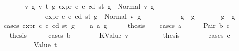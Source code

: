 \begin{isabellebody}
\ \ \ \ \ \ \ {\isachardoublequoteopen}{\isasymAnd}v\ g{\isacharprime}{\kern0pt}\ v{\isacharprime}{\kern0pt}\ t{\isacharprime}{\kern0pt}\ g{\isacharprime}{\kern0pt}{\isacharprime}{\kern0pt}{\isachardot}{\kern0pt}\ expr\ e{}\ e\ cd\ st\ g\ {\isacharequal}{\kern0pt}\ Normal\ {\isacharparenleft}{\kern0pt}v{\isacharcomma}{\kern0pt}\ g{\isacharprime}{\kern0pt}{\isacharparenright}{\kern0pt}\isanewline
\ \ \ \ \ \ \ \ \ \ \ \ {\isasymLongrightarrow}\ expr\ e{}\ e\ cd\ st\ g{\isacharprime}{\kern0pt}\ {\isacharequal}{\kern0pt}\ Normal\ {\isacharparenleft}{\kern0pt}v{\isacharprime}{\kern0pt}{\isacharcomma}{\kern0pt}\ g{\isacharprime}{\kern0pt}{\isacharprime}{\kern0pt}{\isacharparenright}{\kern0pt}\isanewline
\ \ \ \ \ \ \ \ \ \ {\isasymLongrightarrow}\ g{\isacharprime}{\kern0pt}{\isacharprime}{\kern0pt}\ {\isasymle}\ g{\isacharprime}{\kern0pt}{\isachardoublequoteclose}\isanewline
\ \ \ \ \ \ \ {\isachardoublequoteopen}g{\isacharprime}{\kern0pt}\ {\isasymle}\ g{\isachardoublequoteclose}\isanewline
%
\isadelimproof
%
\endisadelimproof
%
\isatagproof
{}\isamarkupfalse%
\ {\isacharparenleft}{\kern0pt}cases\ {\isachardoublequoteopen}expr\ e{}\ e\ cd\ st\ g{\isachardoublequoteclose}{\isacharparenright}{\kern0pt}\isanewline
\ \ \isamarkupfalse%
\ {\isacharparenleft}{\kern0pt}n\ a\ g{}{\isacharprime}{\kern0pt}{\isacharparenright}{\kern0pt}\isanewline
\ \ \isamarkupfalse%
\ \isamarkupfalse%
\ {\isacharquery}{\kern0pt}thesis\isanewline
\ \ \isamarkupfalse%
\ {\isacharparenleft}{\kern0pt}cases\ a{\isacharparenright}{\kern0pt}\isanewline
\ \ \ \ \isamarkupfalse%
\ {\isacharparenleft}{\kern0pt}Pair\ b\ c{\isacharparenright}{\kern0pt}\isanewline
\ \ \ \ \isamarkupfalse%
\ \isamarkupfalse%
\ {\isacharquery}{\kern0pt}thesis\isanewline
\ \ \ \ \isamarkupfalse%
\ {\isacharparenleft}{\kern0pt}cases\ b{\isacharparenright}{\kern0pt}\isanewline
\ \ \ \ \ \ \isamarkupfalse%
\ {\isacharparenleft}{\kern0pt}KValue\ v{}{\isacharparenright}{\kern0pt}\isanewline
\ \ \ \ \ \ \isamarkupfalse%
\ \isamarkupfalse%
\ {\isacharquery}{\kern0pt}thesis\isanewline
\ \ \ \ \ \ \isamarkupfalse%
\ {\isacharparenleft}{\kern0pt}cases\ c{\isacharparenright}{\kern0pt}\isanewline
\ \ \ \ \ \ \ \ \isamarkupfalse%
\ {\isacharparenleft}{\kern0pt}Value\ t{}{\isacharparenright}{\kern0pt}\isanewline

\end{isabellebody}
